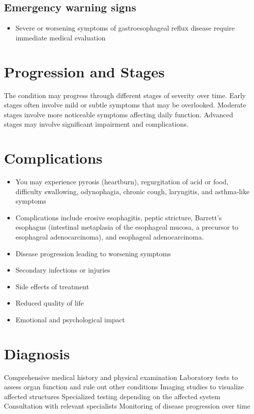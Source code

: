 \subsection{Emergency warning signs}
\begin{itemize}[noitemsep]
  \item Severe or worsening symptoms of gastroesophageal reflux disease require immediate medical evaluation
\end{itemize}
\section{Progression and Stages}
The condition may progress through different stages of severity over time. Early stages often involve mild or subtle symptoms that may be overlooked. Moderate stages involve more noticeable symptoms affecting daily function. Advanced stages may involve significant impairment and complications.
\section{Complications}
\begin{itemize}[noitemsep]
  \item You may experience pyrosis (heartburn), regurgitation of acid or food, difficulty swallowing, odynophagia, chronic cough, laryngitis, and asthma-like symptoms
  \item Complications include erosive esophagitis, peptic stricture, Barrett's esophagus (intestinal metaplasia of the esophageal mucosa, a precursor to esophageal adenocarcinoma), and esophageal adenocarcinoma.
  \item Disease progression leading to worsening symptoms
  \item Secondary infections or injuries
  \item Side effects of treatment
  \item Reduced quality of life
  \item Emotional and psychological impact
\end{itemize}
\section{Diagnosis}
Comprehensive medical history and physical examination Laboratory tests to assess organ function and rule out other conditions Imaging studies to visualize affected structures Specialized testing depending on the affected system Consultation with relevant specialists Monitoring of disease progression over time

